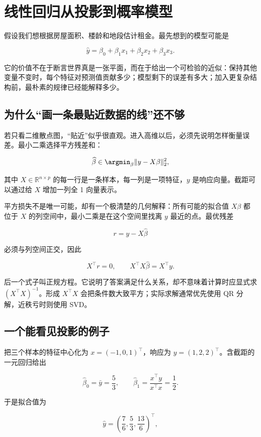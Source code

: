 \section{线性回归从投影到概率模型}

假设我们想根据房屋面积、楼龄和地段估计租金。最先想到的模型可能是

\[
\widehat y=\beta_0+\beta_1x_1+\beta_2x_2+\beta_3x_3.
\]

它的价值不在于断言世界真是一张平面，而在于给出一个可检验的近似：保持其他变量不变时，每个特征对预测值贡献多少；模型剩下的误差有多大；加入更复杂结构前，最朴素的规律已经能解释多少。

\subsection{为什么``画一条最贴近数据的线''还不够}

若只看二维散点图，``贴近''似乎很直观。进入高维以后，必须先说明怎样衡量误差。最小二乘选择平方残差和：

\[
\widehat\beta\in\argmin_\beta\|y-X\beta\|_2^2,
\]

其中 \(X\in\mathbb R^{n\times p}\) 的每一行是一条样本，每一列是一项特征，\(y\) 是响应向量。截距可以通过给 \(X\) 增加一列全 1 向量表示。

平方损失不是唯一可能，却有一个极清楚的几何解释：所有可能的拟合值 \(X\beta\) 都位于 \(X\) 的列空间中，最小二乘是在这个空间里找离 \(y\) 最近的点。最优残差

\[
r=y-X\widehat\beta
\]

必须与列空间正交，因此

\[
X^\top r=0,\qquad
X^\top X\widehat\beta=X^\top y.
\]

后一个式子叫正规方程。它说明了答案满足什么关系，却不意味着计算时应显式求 \((X^\top X)^{-1}\)。形成 \(X^\top X\) 会把条件数大致平方；实际求解通常优先使用 QR 分解，近秩亏时则使用 SVD。

\subsection{一个能看见投影的例子}

把三个样本的特征中心化为 \(x=(-1,0,1)^\top\)，响应为 \(y=(1,2,2)^\top\)。含截距的一元回归给出

\[
\widehat\beta_0=\bar y=\frac53,\qquad
\widehat\beta_1=\frac{x^\top y}{x^\top x}=\frac12.
\]

于是拟合值为

\[
\widehat y=\left(\frac76,\frac53,\frac{13}6\right)^\top,
\]

